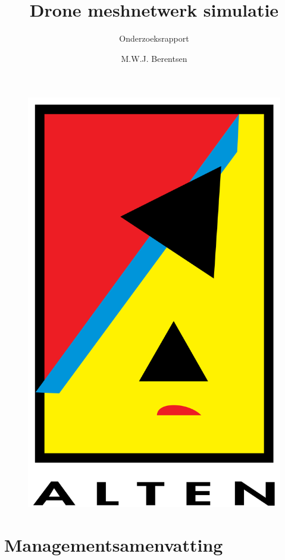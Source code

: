 \documentclass[a4paper, 11pt, oneside]{report}
\author{M.W.J. Berentsen}
\title{\myfont Drone meshnetwerk simulatie}
\subtitle{Onderzoeksrapport}{Versie 2.0}{Alten Nederland B.V.}{Hogeschool van Arnhem en Nijmegen}{HBO Technische Informatica - Embedded Software Developement }{MWJ.Berentsen@student.han.nl}{Studentnummer: 561399}{Docent: J. Visch, MSc}{Assessor: ir. C.G.R. van Uffelen}
\begin{document}
\begin{figure}
\begin{center}\includegraphics[scale=0.1]{alten}\end{center}
\end{figure}
\maketitle


\chapter*{Managementsamenvatting}
\end{document}
